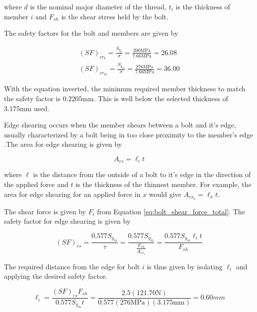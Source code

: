 where $d$ is the nominal major diameter of the thread, $t_i$ is the thickness of member $i$ and $F_{sh}$ is the shear stress held by the bolt.

The safety factors for the bolt and members are given by

\begin{gather}
    (SF)_{cr_b} = \frac{S_{y_b}}{\sigma} = \frac{200\text{MPa}}{7.66\text{MPa}} = 26.08
    \\
    (SF)_{cr_m} = \frac{S_{y_m}}{\sigma} = \frac{276\text{MPa}}{7.66\text{MPa}} = 36.00
\end{gather}{}

With the equation inverted, the minimum required member thickness to match the safety factor is $0.2205\text{mm}$.
This is well below the selected thickness of $3.175\text{mm}$ used.


Edge shearing occurs when the member shears between a bolt and it's edge, usually characterized by a bolt being in too close proximity to the member's edge \cite{juvinall_fundamentals_2012}.The area for edge shearing is given by

\begin{equation}
    A_{es} = \ell_i t
\end{equation}{}

where $\ell$ is the distance from the outside of a bolt to it's edge in the direction of the applied force and $t$ is the thickness of the thinnest member.
For example, the area for edge shearing for an applied force in $x$ would give $A_{es_x} = \ell_x t$.

The shear force is given by $F_i$ from Equation \ref{eq:bolt_shear_force_total}.
The safety factor for edge shearing is given by

\begin{equation}
    (SF)_{es} = \frac{0.577 S_{y_m}}{\tau} = \frac{0.577 S_{y_m}}{\frac{F_{sh}}{A_{es_x}}} = \frac{0.577 S_{y_m} \ell_i t}{F_{sh}}
\end{equation}{}

The required distance from the edge for bolt $i$ is thus given by isolating $\ell_i$ and applying the desired safety factor.

\begin{equation} \label{eq:bolt_edge_shearing_distance}
    \ell_i = \frac{(SF)_{es} F_{sh}}{0.577 S_{y_m} t} = \frac{2.5 (121.70\text{N})}{0.577 (276\text{MPa})(3.175\text{mm})} = 0.60mm
\end{equation}{}


